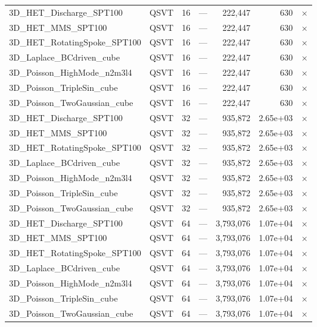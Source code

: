 \begin{table}[htbp]
\begin{tabular}{llrrrrl}
    3D\_HET\_Discharge\_SPT100 & QSVT & 16 & --- & 222,447 & 630 & $\times$ \\
    3D\_HET\_MMS\_SPT100 & QSVT & 16 & --- & 222,447 & 630 & $\times$ \\
    3D\_HET\_RotatingSpoke\_SPT100 & QSVT & 16 & --- & 222,447 & 630 & $\times$ \\
    3D\_Laplace\_BCdriven\_cube & QSVT & 16 & --- & 222,447 & 630 & $\times$ \\
    3D\_Poisson\_HighMode\_n2m3l4 & QSVT & 16 & --- & 222,447 & 630 & $\times$ \\
    3D\_Poisson\_TripleSin\_cube & QSVT & 16 & --- & 222,447 & 630 & $\times$ \\
    3D\_Poisson\_TwoGaussian\_cube & QSVT & 16 & --- & 222,447 & 630 & $\times$ \\
    3D\_HET\_Discharge\_SPT100 & QSVT & 32 & --- & 935,872 & 2.65e+03 & $\times$ \\
    3D\_HET\_MMS\_SPT100 & QSVT & 32 & --- & 935,872 & 2.65e+03 & $\times$ \\
    3D\_HET\_RotatingSpoke\_SPT100 & QSVT & 32 & --- & 935,872 & 2.65e+03 & $\times$ \\
    3D\_Laplace\_BCdriven\_cube & QSVT & 32 & --- & 935,872 & 2.65e+03 & $\times$ \\
    3D\_Poisson\_HighMode\_n2m3l4 & QSVT & 32 & --- & 935,872 & 2.65e+03 & $\times$ \\
    3D\_Poisson\_TripleSin\_cube & QSVT & 32 & --- & 935,872 & 2.65e+03 & $\times$ \\
    3D\_Poisson\_TwoGaussian\_cube & QSVT & 32 & --- & 935,872 & 2.65e+03 & $\times$ \\
    3D\_HET\_Discharge\_SPT100 & QSVT & 64 & --- & 3,793,076 & 1.07e+04 & $\times$ \\
    3D\_HET\_MMS\_SPT100 & QSVT & 64 & --- & 3,793,076 & 1.07e+04 & $\times$ \\
    3D\_HET\_RotatingSpoke\_SPT100 & QSVT & 64 & --- & 3,793,076 & 1.07e+04 & $\times$ \\
    3D\_Laplace\_BCdriven\_cube & QSVT & 64 & --- & 3,793,076 & 1.07e+04 & $\times$ \\
    3D\_Poisson\_HighMode\_n2m3l4 & QSVT & 64 & --- & 3,793,076 & 1.07e+04 & $\times$ \\
    3D\_Poisson\_TripleSin\_cube & QSVT & 64 & --- & 3,793,076 & 1.07e+04 & $\times$ \\
    3D\_Poisson\_TwoGaussian\_cube & QSVT & 64 & --- & 3,793,076 & 1.07e+04 & $\times$ \\

\end{tabular}
\end{table}
